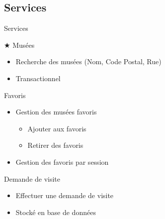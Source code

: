 \FlorentSpeak
\subsection{Services}
\begin{frame}{Services}
	\pause
	\begin{block}{$\bigstar$ Musées}
		\begin{itemize}
			\item Recherche des musées (Nom, Code Postal, Rue)
			\item Transactionnel
		\end{itemize}
	\end{block}	
	\vfill
	\pause
	\begin{block}{Favoris}
		\begin{itemize}
			\item Gestion des musées favoris
			\begin{itemize}
				\item Ajouter aux favoris
				\item Retirer des favoris
			\end{itemize}
			\item Gestion des favoris par session
		\end{itemize}
	\end{block}
	\pause
	\vfill	
	\begin{block}{Demande de visite}
		\begin{itemize}
			\item Effectuer une demande de visite				
			\item Stocké en base de données
		\end{itemize}
	\end{block}
\end{frame}